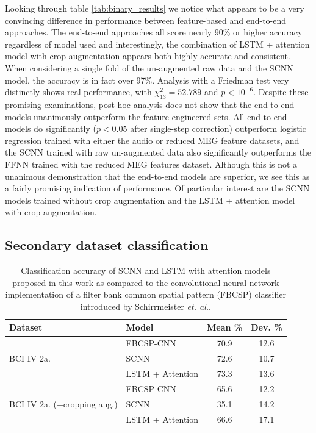 \documentclass[fleqn,10pt]{wlscirep}
\begin{document}
Looking through table \ref{tab:binary_results} we notice what appears to be a very convincing difference in performance between feature-based and end-to-end approaches. The end-to-end approaches all score nearly 90\% or higher accuracy regardless of model used and interestingly, the combination of LSTM + attention model with crop augmentation appears both highly accurate and consistent. When considering a single fold of the un-augmented raw data and the SCNN model, the accuracy is in fact over 97\%. Analysis with a Friedman test very distinctly shows real performance, with $\chi^2_{13}=52.789$ and $p<10^{-6}$. Despite these promising examinations, post-hoc analysis does not show that the end-to-end models unanimously outperform the feature engineered sets. All end-to-end models do significantly ($p<0.05$ after single-step correction) outperform logistic regression trained with either the audio or reduced MEG feature datasets, and the SCNN trained with raw un-augmented data also significantly outperforms the FFNN trained with the reduced MEG features dataset. Although this is not a unanimous demonstration that the end-to-end models are superior, we see this as a fairly promising indication of performance. Of particular interest are the SCNN models trained without crop augmentation and the LSTM + attention model with crop augmentation.


\subsection*{Secondary dataset classification}

\begin{table}[t]
  \caption{Classification accuracy of SCNN and LSTM with attention models proposed in this work as compared to the convolutional neural network implementation of a filter bank common spatial pattern (FBCSP) classifier introduced by Schirrmeister {\em et. al.}\cite{Schirrmeister2017}.}
  \centering
  \begin{tabular}{l l | c | c}
    \toprule
    \textbf{Dataset} & \textbf{Model} & \textbf{Mean \%} & \textbf{Dev. \%} \\
    \toprule
    \multirow{3}{*}{BCI IV 2a.}
                         & FBCSP-CNN           & 70.9 & 12.6  \\
                         & SCNN                & 72.6 & 10.7  \\
                         & LSTM + Attention    & 73.3 & 13.6  \\ 
    \midrule
    \multirow{3}{*}{BCI IV 2a. (+cropping aug.)}
                         & FBCSP-CNN           & 65.6 & 12.2  \\
                         & SCNN                & 35.1 & 14.2  \\
                         & LSTM + Attention    & 66.6 & 17.1  \\ 
    \bottomrule
  \end{tabular}
  \label{tab:sec_results}
\end{table}
\end{document}
